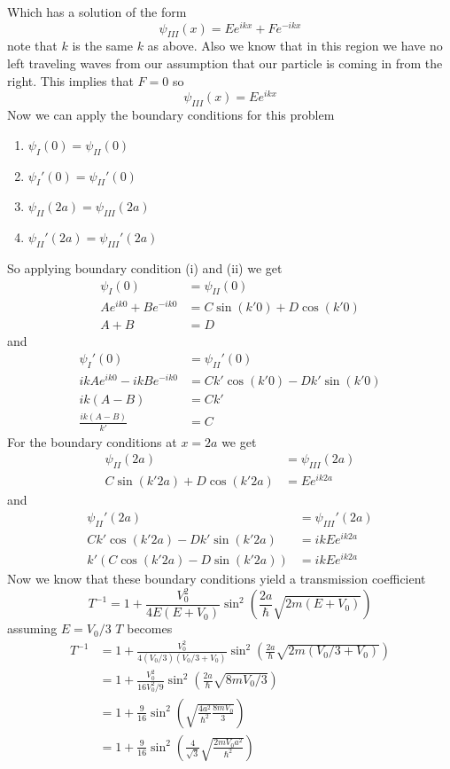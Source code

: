 \documentclass[11pt]{article}
\numberwithin{equation}{section}
\begin{document}
Which has a solution of the form
$$\psi_{III}(x) = Ee^{ikx}+Fe^{-ikx}$$
note that $k$ is the same $k$ as above. Also we know that in this region we have no left traveling waves from our assumption that our particle is coming in from the right. This implies that $F=0$ so 
$$\psi_{III}(x) = Ee^{ikx}$$
Now we can apply the boundary conditions for this problem
\begin{enumerate}[i]
\item $\psi_I(0) = \psi_{II}(0)$
\item $\psi_I'(0) = \psi_{II}'(0)$
\item $\psi_{II}(2a) = \psi_{III}(2a)$
\item $\psi_{II}'(2a) = \psi_{III}'(2a)$
\end{enumerate}
So applying boundary condition (i) and (ii) we get
\begin{align*}
\psi_I(0) &= \psi_{II}(0)\\
Ae^{ik0}+Be^{-ik0} &= C\sin(k'0) + D\cos(k'0)\\
A+B &= D
\end{align*}
and
\begin{align*}
\psi_I'(0) &= \psi_{II}'(0)\\
ikAe^{ik0}-ikBe^{-ik0} &= Ck'\cos(k'0) - Dk'\sin(k'0)\\
ik(A-B) &= Ck'\\
\frac{ik(A-B)}{k'} &= C
\end{align*}
For the boundary conditions at $x=2a$ we get
\begin{align*}
\psi_{II}(2a) &= \psi_{III}(2a)\\
C\sin(k'2a) + D\cos(k'2a) &= Ee^{ik2a}
\end{align*}
and
\begin{align*}
\psi_{II}'(2a) &= \psi_{III}'(2a)\\
Ck'\cos(k'2a) - Dk'\sin(k'2a) &= ikEe^{ik2a}\\
k'(C\cos(k'2a) - D\sin(k'2a)) &= ikEe^{ik2a}
\end{align*}
Now we know that these boundary conditions yield a transmission coefficient
$$T^{-1} = 1+\frac{V_0^2}{4E(E+V_0)}\sin^2\left(\frac{2a}{\hbar}\sqrt{2m(E+V_0)}\right)$$
assuming $E=V_0/3$ $T$ becomes
\begin{align*}
T^{-1} &= 1+\frac{V_0^2}{4(V_0/3)(V_0/3+V_0)}\sin^2\left(\frac{2a}{\hbar}\sqrt{2m(V_0/3+V_0)}\right)\\
&= 1+\frac{V_0^2}{16V_0^2/9}\sin^2\left(\frac{2a}{\hbar}\sqrt{8mV_0/3}\right)\\
&= 1+\frac{9}{16}\sin^2\left(\sqrt{\frac{4a^2}{\hbar^2}\frac{8mV_0}{3}}\right)\\
&= 1+\frac{9}{16}\sin^2\left(\frac{4}{\sqrt{3}}\sqrt{\frac{2mV_0a^2}{\hbar^2}}\right)
\end{align*}
\end{document}
